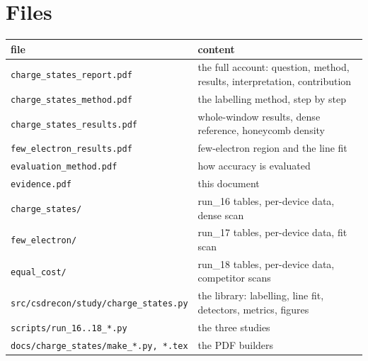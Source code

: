 \documentclass[9.5pt,a4paper]{article}
\newcommand{\file}[1]{\texttt{\footnotesize #1}}
\begin{document}
\section{Files}
\label{sec:files}
\begin{longtable}{P{5.6cm}P{10.6cm}}
\toprule
file & content \\
\midrule
\endhead
\file{charge\_states\_report.pdf} & the full account: question, method,
results, interpretation, contribution \\
\file{charge\_states\_method.pdf} & the labelling method, step by step \\
\file{charge\_states\_results.pdf} & whole-window results, dense
reference, honeycomb density \\
\file{few\_electron\_results.pdf} & few-electron region and the line fit \\
\file{evaluation\_method.pdf} & how accuracy is evaluated \\
\file{evidence.pdf} & this document \\
\file{charge\_states/} & run\_16 tables, per-device data, dense scan \\
\file{few\_electron/} & run\_17 tables, per-device data, fit scan \\
\file{equal\_cost/} & run\_18 tables, per-device data, competitor scans \\
\file{src/csdrecon/study/charge\_states.py} & the library: labelling,
line fit, detectors, metrics, figures \\
\file{scripts/run\_16..18\_*.py} & the three studies \\
\file{docs/charge\_states/make\_*.py, *.tex} & the PDF builders \\
\bottomrule
\end{longtable}
\end{document}
